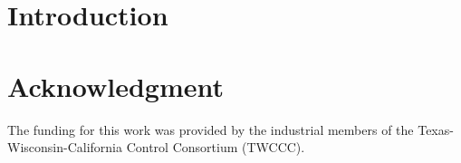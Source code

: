 \documentclass[preprint,5p, twocolumn, authoryear]{elsarticle}
\begin{document}
\section{Introduction} \label{sec:introduction}


\section*{Acknowledgment}
The funding for this work was provided by the industrial members of the
Texas-Wisconsin-California Control Consortium (TWCCC). 



\end{document}
